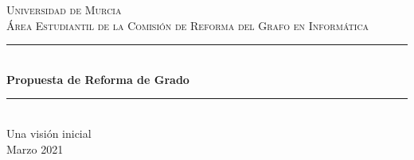 \begin{titlepage}

\newcommand{\HRule}{\rule{\linewidth}{0.5mm}} %

\center %
 

\textsc{\LARGE Universidad de Murcia}\\[1.5cm]
\textsc{\Large
Área Estudiantil de la Comisión de Reforma del Grafo en Informática}\\[0.5cm]


\HRule \\[0.4cm]
{ \huge \bfseries Propuesta de Reforma de Grado}\\[0.4cm]
\HRule \\[0.5cm]
{\large Una visión inicial}\\[2cm]
 


{\large Marzo 2021}\\[2cm]

\end{titlepage}
